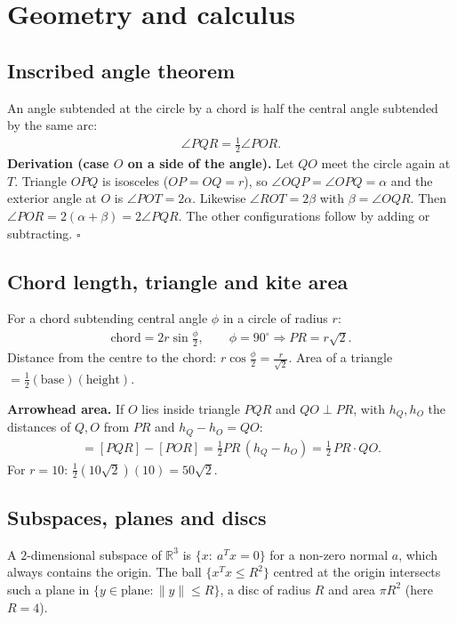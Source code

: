 \section{Geometry and calculus}

\subsection{Inscribed angle theorem}
An angle subtended at the circle by a chord is half the central angle subtended by the same arc:
\begin{align}
\angle PQR=\tfrac12\angle POR. \label{eq:inscribed}
\end{align}
\textbf{Derivation (case $O$ on a side of the angle).} Let $QO$ meet the circle again at $T$. Triangle $OPQ$ is
isosceles ($OP=OQ=r$), so $\angle OQP=\angle OPQ=\alpha$ and the exterior angle at $O$ is
$\angle POT=2\alpha$. Likewise $\angle ROT=2\beta$ with $\beta=\angle OQR$. Then
$\angle POR=2(\alpha+\beta)=2\angle PQR$. The other configurations follow by adding or subtracting. \hfill$\square$

\subsection{Chord length, triangle and kite area}
For a chord subtending central angle $\phi$ in a circle of radius $r$:
\begin{align}
\text{chord}=2r\sin\frac\phi2,\qquad \phi=90^\circ\Rightarrow PR=r\sqrt2. \label{eq:chord}
\end{align}
Distance from the centre to the chord: $r\cos\frac\phi2=\frac{r}{\sqrt2}$.
Area of a triangle $=\tfrac12(\text{base})(\text{height})$.

\textbf{Arrowhead area.} If $O$ lies inside triangle $PQR$ and $QO\perp PR$, with $h_Q,h_O$ the
distances of $Q,O$ from $PR$ and $h_Q-h_O=QO$:
\begin{align}
[PQRO]=[PQR]-[POR]=\tfrac12PR\,(h_Q-h_O)=\tfrac12\,PR\cdot QO. \label{eq:kite}
\end{align}
For $r=10$: $\tfrac12(10\sqrt2)(10)=50\sqrt2$.

\subsection{Subspaces, planes and discs}
A $2$-dimensional subspace of $\mathbb R^3$ is $\{x:\ a^Tx=0\}$ for a non-zero normal $a$, which always
contains the origin. The ball $\{x^Tx\le R^2\}$ centred at the origin intersects such a plane in
$\{y\in\text{plane}: \|y\|\le R\}$, a disc of radius $R$ and area $\pi R^2$ (here $R=4$).

